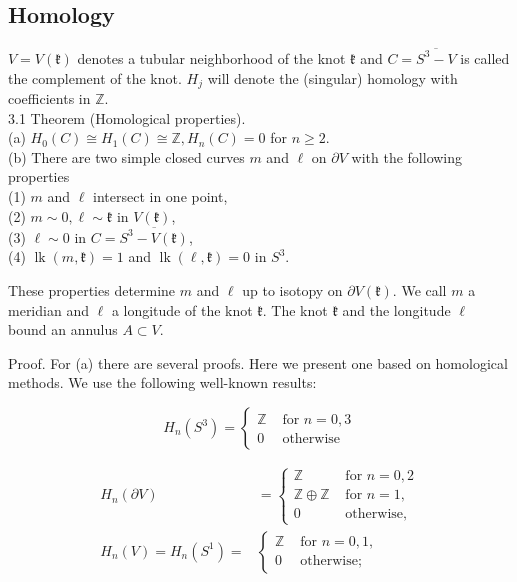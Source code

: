 \documentclass[10pt, letterpaper]{article}
\begin{document}
\subsection{Homology}
$V=V(\mathfrak{k})$ denotes a tubular neighborhood of the knot $\mathfrak{k}$ and $C=\overline{S^{3}-V}$ is called the complement of the knot. $H_{j}$ will denote the (singular) homology with coefficients in $\mathbb{Z}$.\\
3.1 Theorem (Homological properties).\\
(a) $H_{0}(C) \cong H_{1}(C) \cong \mathbb{Z}, H_{n}(C)=0$ for $n \geq 2$.\\
(b) There are two simple closed curves $m$ and $\ell$ on $\partial V$ with the following properties\\
(1) $m$ and $\ell$ intersect in one point,\\
(2) $m \sim 0, \ell \sim \mathfrak{k}$ in $V(\mathfrak{k})$,\\
(3) $\ell \sim 0$ in $C=\overline{S^{3}-V(\mathfrak{k})}$,\\
(4) $\operatorname{lk}(m, \mathfrak{k})=1$ and $\operatorname{lk}(\ell, \mathfrak{k})=0$ in $S^{3}$.

These properties determine $m$ and $\ell$ up to isotopy on $\partial V(\mathfrak{k})$. We call $m$ a meridian and $\ell$ a longitude of the knot $\mathfrak{k}$. The knot $\mathfrak{k}$ and the longitude $\ell$ bound an annulus $A \subset V$.

Proof. For (a) there are several proofs. Here we present one based on homological methods. We use the following well-known results:

$$
H_{n}\left(S^{3}\right)= \begin{cases}\mathbb{Z} & \text { for } n=0,3 \\ 0 & \text { otherwise }\end{cases}
$$

$$
\begin{aligned}
H_{n}(\partial V) & = \begin{cases}\mathbb{Z} & \text { for } n=0,2 \\
\mathbb{Z} \oplus \mathbb{Z} & \text { for } n=1, \\
0 & \text { otherwise, }\end{cases} \\
H_{n}(V)=H_{n}\left(S^{1}\right)= & \begin{cases}\mathbb{Z} & \text { for } n=0,1, \\
0 & \text { otherwise; }\end{cases}
\end{aligned}
$$
\end{document}
